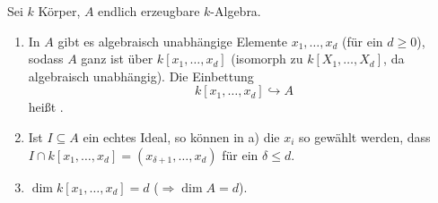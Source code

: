 \documentclass[a4paper, 10pt]{report}
\begin{document}
\begin{Satz}
\label{11}
Sei $k$ K\"orper, $A$ endlich erzeugbare $k$-Algebra.
\begin{enumerate}
\item In $A$ gibt es algebraisch unabh\"angige Elemente $x_1, \ldots, x_d$ (f\"ur ein
$d\geq 0$), sodass $A$ ganz ist \"uber $k[x_1, \ldots, x_d]$ (isomorph zu 
$k[X_1,\ldots,X_d]$, da algebraisch unabh\"angig). Die Einbettung
\[
k[x_1,\ldots,x_d]\hookrightarrow A
\]
heißt .
\item Ist $I\subseteq A$ ein echtes Ideal, so k\"onnen in a) die $x_i$ so
gew\"ahlt werden, dass $I\cap k[x_1, \ldots, x_d]=(x_{\delta+1},\ldots,x_d)$ f\"ur ein
$\delta \leq d$.
\item $\dim{k[x_1,\ldots,x_d]}=d$ ($\Rightarrow \dim{A} = d$).
\end{enumerate}
\end{Satz}
\end{document}
